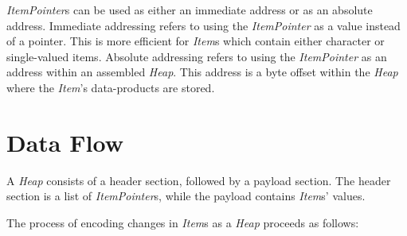 \documentclass[11pt,english,twoside]{article}
\begin{document}
\emph{ItemPointer}s can be used as either an immediate address or as an absolute address. Immediate addressing refers to using the
\emph{ItemPointer} as a value instead of a pointer. This is more efficient for \emph{Item}s which contain either character or single-valued
items. Absolute addressing refers to using the \emph{ItemPointer} as an address within an assembled \emph{Heap}. This address is a byte offset
within the \emph{Heap} where the \emph{Item}'s data-products are stored.


\section{Data Flow}

A \emph{Heap} consists of a header section, followed by a payload section. The header section is a list of \emph{ItemPointer}s, while the
payload contains \emph{Item}s' values.

The process of encoding changes in \emph{Item}s as a \emph{Heap} proceeds as follows:
\end{document}
